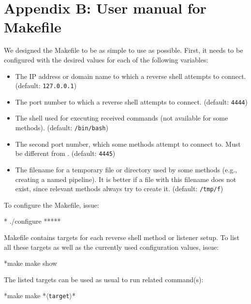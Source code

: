 \newcommand{\target}{\textcolor{placeholder}{\texttt{$\langle$target$\rangle$}}}

\chapter*{Appendix B: User manual for Makefile}

We designed the Makefile to be as simple to use as possible. First, it needs to be configured with the desired values for each of the following variables:

\setlength{\leftmargini}{5em}
\begin{itemize}
\item[\host] The IP address or domain name to which a reverse shell attempts to connect. (default: \texttt{127.0.0.1})
\item[\port] The port number to which a reverse shell attempts to connect. (default: \texttt{4444})
\item[\shell] The shell used for executing received commands (not available for some methods). (default: \texttt{/bin/bash})
\item[\portt] The second port number, which some methods attempt to connect to. Must be different from \port. (default: \texttt{4445})
\item[\tmp] The filename for a temporary file or directory used by some methods (e.g., creating a named pipeline). It is better if a file with this filename does not exist, since relevant methods always try to create it. (default: \texttt{/tmp/f})
\end{itemize}
\setlength{\leftmargini}{2.5em}

To configure the Makefile, issue:

\begin{cmdline}{*}{}{}
./configure *\host* *\port* *\shell* *\portt* *\tmp*
\end{cmdline}

Makefile contains targets for each reverse shell method or listener setup. To list all these targets as well as the currently used configuration values, issue:

\begin{cmdline}{*}{make}{}
make show
\end{cmdline}

The listed targets can be used as usual to run related command(s):

\begin{cmdline}{*}{make}{}
make *\target*
\end{cmdline}

